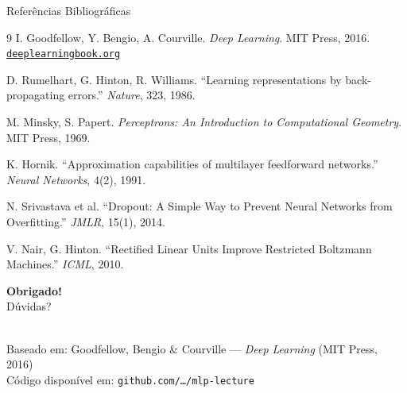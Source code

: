 \documentclass[7pt, aspectratio=169,10pt]{beamer}
\begin{document}
\begin{frame}{Referências Bibliográficas}
\small
\begin{thebibliography}{9}
    I. Goodfellow, Y. Bengio, A. Courville.
    \textit{Deep Learning}. MIT Press, 2016.
    \href{https://www.deeplearningbook.org}{\texttt{deeplearningbook.org}}

    D. Rumelhart, G. Hinton, R. Williams.
    ``Learning representations by back-propagating errors.''
    \textit{Nature}, 323, 1986.

    M. Minsky, S. Papert.
    \textit{Perceptrons: An Introduction to Computational Geometry}.
    MIT Press, 1969.

    K. Hornik. ``Approximation capabilities of multilayer feedforward networks.''
    \textit{Neural Networks}, 4(2), 1991.

    N. Srivastava et al. ``Dropout: A Simple Way to Prevent Neural Networks from Overfitting.''
    \textit{JMLR}, 15(1), 2014.

    V. Nair, G. Hinton. ``Rectified Linear Units Improve Restricted Boltzmann Machines.''
    \textit{ICML}, 2010.
\end{thebibliography}
\end{frame}

\begin{frame}
  \centering
  \vspace{1.5cm}
  {\Huge\bfseries\color{deepblue} Obrigado!}\\[1.5cm]
  {\large Dúvidas?}\\[1cm]
  \\[0.8cm]
  {\small\color{gray}
  Baseado em: Goodfellow, Bengio \& Courville — \textit{Deep Learning} (MIT Press, 2016)\\
  Código disponível em: \texttt{github.com/\ldots/mlp-lecture}}
\end{frame}
\end{document}
